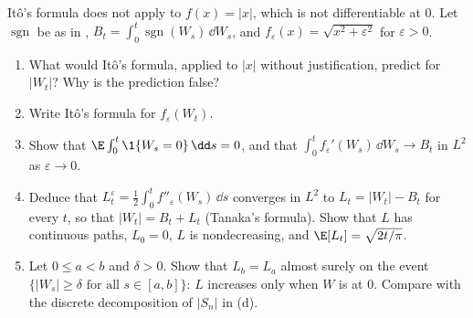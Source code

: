 \begin{exercise}\label{ex:itf-tanaka}
\hard It\^o's formula does not apply to $f(x)=|x|$, which is not differentiable at $0$. Let
$\operatorname{sgn}$ be as in , $B_t=\int_0^t\operatorname{sgn}(W_s)\,\dd W_s$,
and $f_\varepsilon(x)=\sqrt{x^2+\varepsilon^2}$ for $\varepsilon>0$.
\begin{enumerate}[label=(\alph*)]
  \item What would It\^o's formula, applied to $|x|$ without justification, predict for $|W_t|$? Why is
    the prediction false?
  \item Write It\^o's formula for $f_\varepsilon(W_t)$.
  \item Show that $\E\int_0^t\1\{W_s=0\}\,\dd s=0$, and that $\int_0^tf_\varepsilon'(W_s)\,\dd W_s\to B_t$ in
    $L^2$ as $\varepsilon\to0$.
  \item Deduce that $L^\varepsilon_t=\frac12\int_0^tf''_\varepsilon(W_s)\,\dd s$ converges in $L^2$ to
    $L_t=|W_t|-B_t$ for every $t$, so that $|W_t|=B_t+L_t$ (Tanaka's formula). Show that $L$ has continuous
    paths, $L_0=0$, $L$ is nondecreasing, and $\E[L_t]=\sqrt{2t/\pi}$.
  \item Let $0\le a<b$ and $\delta>0$. Show that $L_b=L_a$ almost surely on the event
    $\{|W_s|\ge\delta\text{ for all }s\in[a,b]\}$: $L$ increases only when $W$ is at $0$. Compare with the
    discrete decomposition of $|S_n|$ in (d).
\end{enumerate}
\end{exercise}
